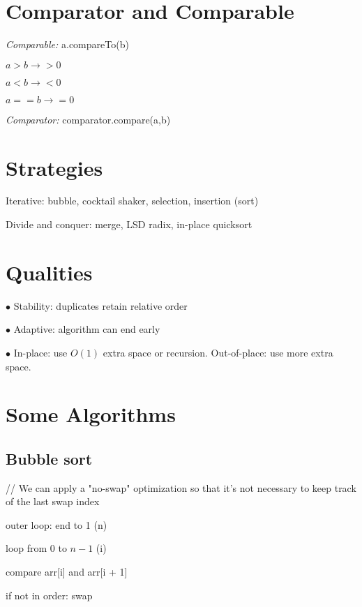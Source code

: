 \documentclass[english,openany]{book}
\begin{document}
    \section{Comparator and Comparable}

    \textit{Comparable:} a.compareTo(b)

    $a > b \rightarrow > 0$

    $a < b \rightarrow < 0$

    $a == b \rightarrow = 0$

    \textit{Comparator:} comparator.compare(a,b)\\

    \section{Strategies}

    Iterative: bubble, cocktail shaker, selection, insertion (sort)

    Divide and conquer: merge, LSD radix, in-place quicksort\\

    \section{Qualities}

    $\bullet$ Stability: duplicates retain relative order

    $\bullet$ Adaptive: algorithm can end early

    $\bullet$ In-place: use $O(1)$ extra space or recursion. Out-of-place: use more extra space.\\

    \section{Some Algorithms}

    \subsection{Bubble sort}

    // We can apply a "no-swap" optimization so that it's not necessary to keep track of the last swap index

    outer loop: end to 1 (n)

    \qquad loop from 0 to $n-1$ (i)

    \qquad compare arr[i] and arr[i + 1]

    \qquad if not in order: swap\\
\end{document}
